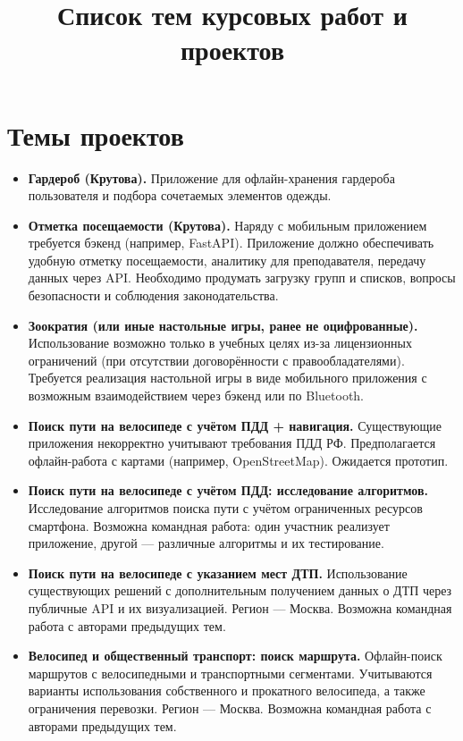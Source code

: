 \documentclass[a4paper,12pt]{article}
\title{\textbf{Список тем курсовых работ и проектов}}
\author{}
\date{}
\begin{document}
\maketitle

\section*{Темы проектов}

\begin{itemize}

\item \textbf{Гардероб (Крутова).}
Приложение для офлайн-хранения гардероба пользователя и подбора сочетаемых элементов одежды.

\item \textbf{Отметка посещаемости (Крутова).}
Наряду с мобильным приложением требуется бэкенд (например, FastAPI). Приложение должно обеспечивать удобную отметку посещаемости, аналитику для преподавателя, передачу данных через API. Необходимо продумать загрузку групп и списков, вопросы безопасности и соблюдения законодательства.

\item \textbf{Зоократия (или иные настольные игры, ранее не оцифрованные).}
Использование возможно только в учебных целях из-за лицензионных ограничений (при отсутствии договорённости с правообладателями). Требуется реализация настольной игры в виде мобильного приложения с возможным взаимодействием через бэкенд или по Bluetooth.

\item \textbf{Поиск пути на велосипеде с учётом ПДД + навигация.}
Существующие приложения некорректно учитывают требования ПДД РФ. Предполагается офлайн-работа с картами (например, OpenStreetMap). Ожидается прототип.

\item \textbf{Поиск пути на велосипеде с учётом ПДД: исследование алгоритмов.}
Исследование алгоритмов поиска пути с учётом ограниченных ресурсов смартфона. Возможна командная работа: один участник реализует приложение, другой — различные алгоритмы и их тестирование.

\item \textbf{Поиск пути на велосипеде с указанием мест ДТП.}
Использование существующих решений с дополнительным получением данных о ДТП через публичные API и их визуализацией. Регион — Москва.
Возможна командная работа с авторами предыдущих тем.

\item \textbf{Велосипед и общественный транспорт: поиск маршрута.}
Офлайн-поиск маршрутов с велосипедными и транспортными сегментами. Учитываются варианты использования собственного и прокатного велосипеда, а также ограничения перевозки. Регион — Москва.
Возможна командная работа с авторами предыдущих тем.


\end{itemize}
\end{document}
